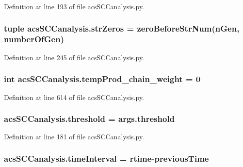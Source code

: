 Definition at line 193 of file acs\-S\-C\-Canalysis.\-py.

\hypertarget{a00128_a8ba6aefb71b3d1e575eac38627f143d6}{
\subsubsection[{str\-Zeros}]{\setlength{\rightskip}{0pt plus 5cm}tuple acs\-S\-C\-Canalysis.\-str\-Zeros = {\bf zero\-Before\-Str\-Num}(n\-Gen, {\bf number\-Of\-Gen})}}\label{a00128_a8ba6aefb71b3d1e575eac38627f143d6}


Definition at line 245 of file acs\-S\-C\-Canalysis.\-py.

\hypertarget{a00128_aaf17c99825e0961e4cfaa173ddfffe84}{
\subsubsection[{temp\-Prod\-\_\-chain\-\_\-weight}]{\setlength{\rightskip}{0pt plus 5cm}int acs\-S\-C\-Canalysis.\-temp\-Prod\-\_\-chain\-\_\-weight = 0}}\label{a00128_aaf17c99825e0961e4cfaa173ddfffe84}


Definition at line 614 of file acs\-S\-C\-Canalysis.\-py.

\hypertarget{a00128_ae1fe4f15ea3fbcf05be2c82cd6f80307}{
\subsubsection[{threshold}]{\setlength{\rightskip}{0pt plus 5cm}acs\-S\-C\-Canalysis.\-threshold = args.\-threshold}}\label{a00128_ae1fe4f15ea3fbcf05be2c82cd6f80307}


Definition at line 181 of file acs\-S\-C\-Canalysis.\-py.

\hypertarget{a00128_a7d0f86310c439e970e0b41121364027c}{
\subsubsection[{time\-Interval}]{\setlength{\rightskip}{0pt plus 5cm}acs\-S\-C\-Canalysis.\-time\-Interval = {\bf rtime}-\/{\bf previous\-Time}}}\label{a00128_a7d0f86310c439e970e0b41121364027c}


